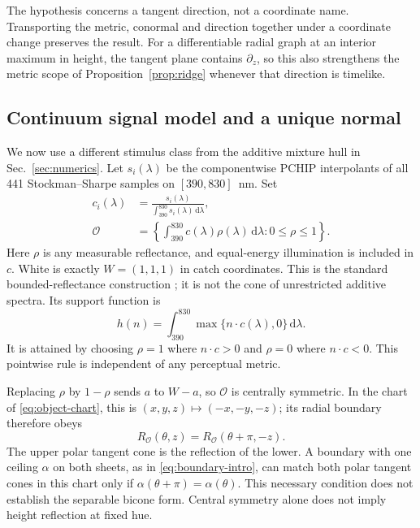 \documentclass[9pt,twocolumn,twoside]{opticajnl}
\theoremstyle{plain}
\newcommand{\dd}{\mathrm{d}}
\begin{document}
The hypothesis concerns a tangent direction, not a coordinate name. Transporting the metric, conormal and direction together under a coordinate change preserves the result. For a differentiable radial graph at an interior maximum in height, the tangent plane contains $\partial_z$, so this also strengthens the metric scope of Proposition~\ref{prop:ridge} whenever that direction is timelike.

\subsection{Continuum signal model and a unique normal}
We now use a different stimulus class from the additive mixture hull in Sec.~\ref{sec:numerics}. Let $s_i(\lambda)$ be the componentwise PCHIP interpolants of all 441 Stockman--Sharpe samples on $[390,830]$~nm. Set
\begin{equation}
 \begin{aligned}
 c_i(\lambda)&=\frac{s_i(\lambda)}{\int_{390}^{830}s_i(\lambda)\,\dd\lambda},\\
 \mathcal O&=\left\{\int_{390}^{830}c(\lambda)\rho(\lambda)\,\dd\lambda:
 0\leq\rho\leq1\right\}.
 \end{aligned}
 \label{eq:object-solid}
\end{equation}
Here $\rho$ is any measurable reflectance, and equal-energy illumination is included in $c$. White is exactly $W=(1,1,1)$ in catch coordinates. This is the standard bounded-reflectance construction \cite{Logvinenko2025}; it is not the cone of unrestricted additive spectra. Its support function is
\begin{equation}
 h(n)=\int_{390}^{830}\max\{n\cdot c(\lambda),0\}\,\dd\lambda.
 \label{eq:object-support}
\end{equation}
It is attained by choosing $\rho=1$ where $n\cdot c>0$ and $\rho=0$ where $n\cdot c<0$. This pointwise rule is independent of any perceptual metric.

Replacing $\rho$ by $1-\rho$ sends $a$ to $W-a$, so $\mathcal O$ is centrally symmetric. In the chart of \eqref{eq:object-chart}, this is $(x,y,z)\mapsto(-x,-y,-z)$; its radial boundary therefore obeys
\begin{equation}
 R_{\mathcal O}(\theta,z)=R_{\mathcal O}(\theta+\pi,-z).
 \label{eq:object-complement}
\end{equation}
The upper polar tangent cone is the reflection of the lower. A boundary with one ceiling $\alpha$ on both sheets, as in \eqref{eq:boundary-intro}, can match both polar tangent cones in this chart only if $\alpha(\theta+\pi)=\alpha(\theta)$. This necessary condition does not establish the separable bicone form. Central symmetry alone does not imply height reflection at fixed hue.
\end{document}
